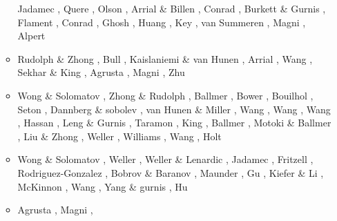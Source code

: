 \begin{itemize}
\begin{scriptsize}
\begin{itemize}
                            Jadamec \etal \cite{jabr13}, Quere \etal \cite{qula13},
                            Olson \etal \cite{oldh13}, Arrial \& Billen \cite{arbi13},
                            Conrad \etal \cite{cost13}, Burkett \& Gurnis \cite{bugu13},
                            Flament \etal \cite{flgm13}, Conrad \cite{conr13},
                            Ghosh \etal \cite{ghbh13}, Huang \etal \cite{huyz13},
                            Key \etal \cite{kecl13}, van Summeren \etal \cite{vagc13},
                            Magni \etal \cite{mafv13}, Alpert \etal \cite{almb13}
\item[\twothousandfourteen] Rudolph \& Zhong \cite{ruzh14}, \cite{flgw14}
                            Bull \etal \cite{budt14}, Kaislaniemi \& van Hunen \cite{kava14},
                            Arrial \etal \cite{arfw14}, Wang \etal \cite{wavp14},
                            Sekhar \& King \cite{seki14}, Agrusta \etal \cite{agvg14},
                            Magni \etal \cite{mabv14}, Zhu \cite{zhu14}
\item[\twothousandfifteen] Wong \& Solomatov \cite{woso15}, Zhong \& Rudolph \cite{zhru15}, 
                    Ballmer \etal \cite{bacs15}, Bower \etal \cite{bogf15},
                    Bouilhol \etal \cite{bomv15}, Seton \etal \cite{sefw15},
                    Dannberg \& sobolev \cite{daso15}, van Hunen \& Miller \cite{vami15},
                    Wang \etal \cite{wazh15}, Wang \etal \cite{wavp15},
                    Wang \etal \cite{waav15}, Hassan \etal \cite{hafg15},
                    Leng \& Gurnis \cite{legu15}, Taramon \etal \cite{tarn15}, 
                    King \cite{king15},
                    Ballmer \etal \cite{basn15}, Motoki \& Ballmer \cite{moba15},
                    Liu \& Zhong \cite{lizh15}, Weller \etal \cite{welo15},
                    Williams \etal \cite{wilm15}, Wang \etal \cite{wahz15},
                    Holt \etal \cite{hobb15}
\item[\twothousandsixteen] Wong \& Solomatov \cite{woso16a,woso16b}, Weller \etal \cite{welm16},
                    Weller \& Lenardic \cite{wele16}, Jadamec \cite{jada16,jada16b},
                    Fritzell \etal \cite{frbs16}, Rodriguez-Gonzalez \etal \cite{robn16},
                    Bobrov \& Baranov \cite{boba16}, Maunder \etal \cite{mavm16},
                    Gu \etal \cite{gulm16}, Kiefer \& Li \cite{kili16},
                    McKinnon \etal \cite{mcnw16}, Wang \etal \cite{wahz16},
                    Yang \& gurnis \cite{yagu16}, Hu \etal \cite{hulh16}
\item[\twothousandseventeen] Agrusta \etal \cite{aggv17}, Magni \etal \cite{maav17},

\end{itemize}
\end{scriptsize}
\end{itemize}
